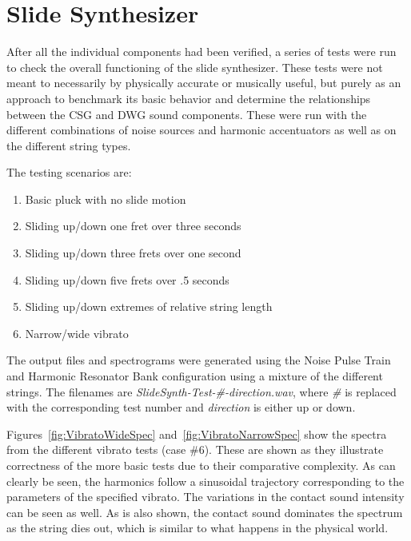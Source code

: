 \documentclass[../main.tex]{subfiles}
\begin{document}
\section{Slide Synthesizer}
After all the individual components had been verified, a series of tests were run to check the overall functioning of the slide synthesizer. These tests were not meant to necessarily by physically accurate or musically useful, but purely as an approach to benchmark its basic behavior and determine the relationships between the CSG and DWG sound components. These were run with the different combinations of noise sources and harmonic accentuators as well as on the different string types. 

The testing scenarios are:
\begin{enumerate}
    \item Basic pluck with no slide motion
    \item Sliding up/down one fret over three seconds
    \item Sliding up/down three frets over one second
    \item Sliding up/down five frets over .5 seconds
    \item Sliding up/down extremes of relative string length
    \item Narrow/wide vibrato
\end{enumerate}
The output files and spectrograms were generated using the Noise Pulse Train and Harmonic Resonator Bank configuration using a mixture of the different strings. The filenames are \emph{SlideSynth-Test-\#-direction.wav}, where \emph{\#} is replaced with the corresponding test number and \emph{direction} is either up or down.

Figures~\ref{fig:VibratoWideSpec} and~\ref{fig:VibratoNarrowSpec} show the spectra from the different vibrato tests (case \#6). These are shown as they illustrate correctness of the more basic tests due to their comparative complexity. As can clearly be seen, the harmonics follow a sinusoidal trajectory corresponding to the parameters of the specified vibrato. The variations in the contact sound intensity can be seen as well. As is also shown, the contact sound dominates the spectrum as the string dies out, which is similar to what happens in the physical world.
\end{document}
